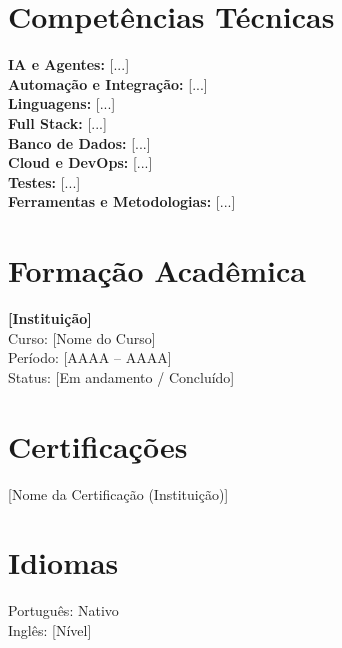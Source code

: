 \documentclass[10pt,a4paper]{article}
\begin{document}
\section*{Competências Técnicas}

\textbf{IA e Agentes:} [...] \\
\textbf{Automação e Integração:} [...] \\
\textbf{Linguagens:} [...] \\
\textbf{Full Stack:} [...] \\
\textbf{Banco de Dados:} [...] \\
\textbf{Cloud e DevOps:} [...] \\
\textbf{Testes:} [...] \\
\textbf{Ferramentas e Metodologias:} [...]

\section*{Formação Acadêmica}

\textbf{[Instituição]} \\
Curso: [Nome do Curso] \\
Período: [AAAA -- AAAA] \\
Status: [Em andamento / Concluído]

\section*{Certificações}

[Nome da Certificação (Instituição)] \\
[Nome da Certificação (Instituição) -- MM/AAAA]

\section*{Idiomas}

Português: Nativo \\
Inglês: [Nível]
\end{document}
